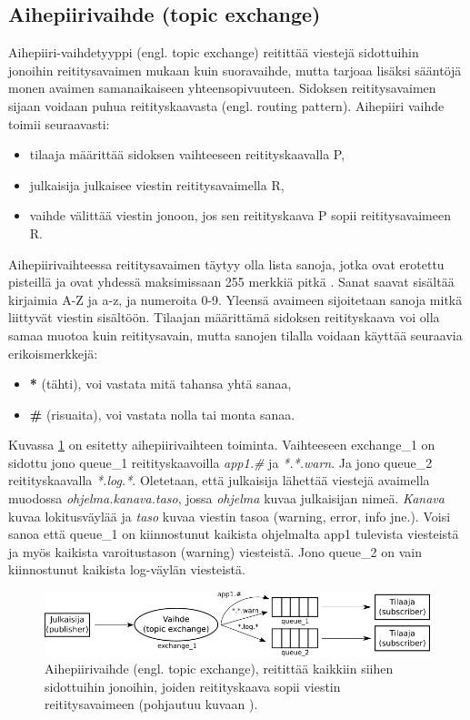 \subsection{Aihepiirivaihde (topic exchange)}
Aihepiiri-vaihdetyyppi (engl. topic exchange) reitittää viestejä sidottuihin jonoihin reititysavaimen mukaan kuin suoravaihde, mutta tarjoaa lisäksi sääntöjä monen avaimen samanaikaiseen yhteensopivuuteen. Sidoksen reititysavaimen sijaan voidaan puhua reitityskaavasta (engl. routing pattern). Aihepiiri vaihde toimii seuraavasti:
\begin{itemize}
	\item tilaaja määrittää sidoksen vaihteeseen reitityskaavalla P,
	\item julkaisija julkaisee viestin reititysavaimella R,
	\item vaihde välittää viestin jonoon, jos sen reitityskaava P sopii reititysavaimeen R.
\end{itemize}
Aihepiirivaihteessa reititysavaimen täytyy olla lista sanoja, jotka ovat erotettu pisteillä ja ovat yhdessä maksimissaan 255 merkkiä pitkä \mbox{\cite[s.~35]{AMQP-specification}}. Sanat saavat sisältää kirjaimia A-Z ja a-z, ja numeroita 0-9. Yleensä avaimeen sijoitetaan sanoja mitkä liittyvät viestin sisältöön. Tilaajan määrittämä sidoksen reitityskaava voi olla samaa muotoa kuin reititysavain, mutta sanojen tilalla voidaan käyttää seuraavia erikoismerkkejä:
\begin{itemize}
	\item \textbf{*} (tähti), voi vastata mitä tahansa yhtä sanaa,
	\item \textbf{\#} (risuaita), voi vastata nolla tai monta sanaa. \mbox{\cite[s.~27]{AMQP-specification}}
\end{itemize}

Kuvassa \ref{fig:amqp-topic-exchange} on esitetty aihepiirivaihteen toiminta. Vaihteeseen exchange\_1 on sidottu jono queue\_1 reitityskaavoilla \emph{app1.\#} ja \emph{*.*.warn}. Ja jono queue\_2 reitityskaavalla \emph{*.log.*}. Oletetaan, että julkaisija lähettää viestejä avaimella muodossa \emph{ohjelma.kanava.taso}, jossa \emph{ohjelma} kuvaa julkaisijan nimeä. \emph{Kanava} kuvaa lokitusväylää ja \emph{taso} kuvaa viestin tasoa (warning, error, info jne.). Voisi sanoa että queue\_1 on kiinnostunut kaikista ohjelmalta app1 tulevista viesteistä ja myös kaikista varoitustason (warning) viesteistä. Jono queue\_2 on vain kiinnostunut kaikista log-väylän viesteistä.

\begin{figure}[ht!]
	\includegraphics[width=1\textwidth]{pictures/amqp-topic-exchange.png}
	\caption{Aihepiirivaihde (engl. topic exchange), reitittää kaikkiin siihen sidottuihin jonoihin, joiden reitityskaava sopii viestin reititysavaimeen (pohjautuu kuvaan \mbox{\cite{RabbitMQ-Tutorial-Topics}}).}
	\label{fig:amqp-topic-exchange}
\end{figure}

